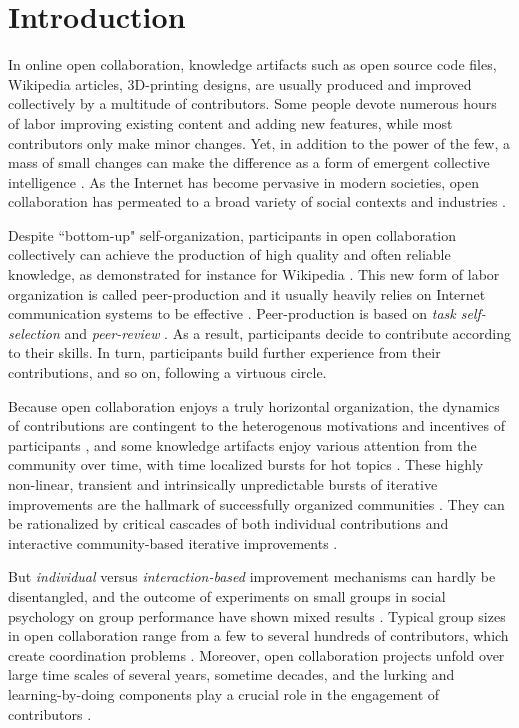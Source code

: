 \section{Introduction}
In online open collaboration, knowledge artifacts such as open source code files, Wikipedia articles,  3D-printing designs, are usually produced and improved collectively by a multitude of contributors. Some people devote numerous hours of labor improving existing content and adding new features, while most contributors only make minor changes. Yet, in addition to the power of the few, a mass of small changes can make the difference as a form of emergent collective intelligence \cite{kittur2007power}.  As the Internet has become pervasive in modern societies, open collaboration has permeated to a broad variety of social contexts and industries \cite{benkler2011leviathan}. 

Despite ``bottom-up" self-organization, participants in open collaboration collectively can achieve  the production of high quality and often reliable knowledge, as demonstrated for instance for Wikipedia \cite{giles2005internet}. This new form of labor organization is called peer-production and it usually heavily relies on Internet communication systems to be effective \cite{benkler2002}. Peer-production is based on {\it task self-selection} and {\it peer-review} \cite{benkler2002}. As a result, participants decide to contribute according to their skills. In turn, participants build further experience from their contributions, and so on, following a virtuous circle.

Because open collaboration enjoys a truly horizontal organization, the dynamics of contributions are contingent to the heterogenous motivations and incentives of participants \cite{vonKrogh2012}, and some knowledge artifacts enjoy various attention from the community over time, with time localized bursts for hot topics \cite{keegan2013hotoff}. These  highly non-linear, transient and intrinsically unpredictable bursts of iterative improvements are the hallmark of successfully organized communities \cite{vonkrogh2014designing}. They can be rationalized by critical cascades of both individual contributions and interactive community-based iterative improvements \cite{sornette2014howmuch}. 

But {\it individual} versus {\it interaction-based} improvement mechanisms can hardly be disentangled, and the outcome of experiments on small groups in social psychology on group performance have shown mixed results \cite{shaw1932comparison}. Typical group sizes in open collaboration range from a few to several hundreds of contributors, which create coordination problems \cite{halfaker2013}. Moreover, open collaboration projects unfold over large time scales of several years, sometime decades, and the lurking and learning-by-doing components play a crucial role in the engagement of contributors \cite{vonkrogh2003}.

